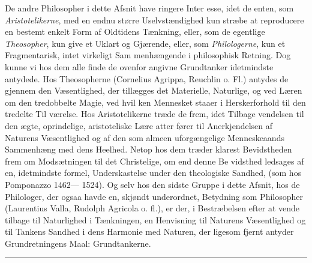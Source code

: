 \documentclass[12pt,a4paper]{book}
\newcommand{\divrule}{\begin{center}\rule{2cm}{0.4pt}\end{center}}
\begin{document}
De andre Philosopher i dette Afsnit have ringere Inter\-%
esse, idet de enten, som \emph{Aristotelikerne}, med en endnu
større Uselvstændighed kun stræbe at reproducere en bestemt
enkelt Form af Oldtidens Tænkning, eller, som de egentlige
\emph{Theosopher}, kun give et Uklart og Gjærende, eller, som
\emph{Philologerne}, kun et Fragmentarisk, intet virkeligt Sam\-%
menhængende i philosophisk Retning. Dog kunne vi hos dem
alle finde de ovenfor angivne Grundtanker idetmindste antydede.
Hos Theosopherne (Cornelius Agrippa, Reuchlin o. Fl.) antydes
de gjennem den Væsentlighed, der tillægges det Materielle,
Naturlige, og ved Læren om den tredobbelte Magie, ved hvil\-%
ken Mennesket staaer i Herskerforhold til den tredelte Til\-%
værelse. Hos Aristotelikerne træde de frem, idet Tilbage\-%
vendelsen til den ægte, oprindelige, aristoteliske Lære atter
fører til Anerkjendelsen af Naturens Væsentlighed og af den
som almeen uforgængelige Menneskeaands Sammenhæng med
dens Heelhed. Netop hos dem træder klarest Bevidstheden
frem om Modsætningen til det Christelige, om end denne Be\-%
vidsthed ledsages af en, idetmindste formel, Underskastelse
under den theologiske Sandhed, (som hos Pomponazzo 1462---%
1524). Og selv hos den sidste Gruppe i dette Afsnit, hos de
Philologer, der ogsaa havde en, skjøndt underordnet, Betydning
som Philosopher (Laurentius Valla, Rudolph Agricola o. fl.), er
der, i Bestræbelsen efter at vende tilbage til Naturlighed i
Tænkningen, en Henvisning til Naturens Væsentlighed og til
Tankens Sandhed i dens Harmonie med Naturen, der ligesom
fjernt antyder Grundretningens Maal: Grundtankerne.

\divrule
\end{document}

